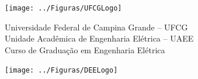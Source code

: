 \documentclass[12pt,addpoints]{exam}
\begin{document}



\newpage \clearpage {}

\noindent \texttt{[image: ../Figuras/UFCGLogo]} \hfill
\begin{minipage}{.66\textwidth} \large \centering \vspace{-1.8cm}
    Universidade Federal de Campina Grande -- UFCG \\
    Unidade Acadêmica de Engenharia Elétrica -- UAEE \\
    Curso de Graduação em Engenharia Elétrica
\end{minipage}
\hfill \texttt{[image: ../Figuras/DEELogo]} \\[12pt]
\end{document}
